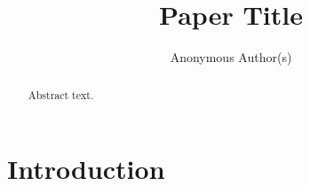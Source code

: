 \documentclass{article}
\title{Paper Title}
\author{Anonymous Author(s)}
\begin{document}
\maketitle

\begin{abstract}
Abstract text.
\end{abstract}

\section{Introduction}



\end{document}
